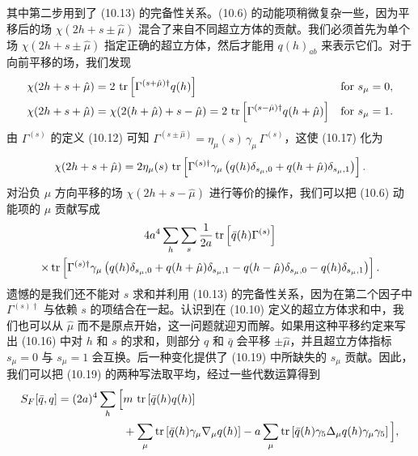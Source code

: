 其中第二步用到了 (10.13) 的完备性关系。(10.6) 的动能项稍微复杂一些，因为平移后的场 $\chi(2h + s \pm \hat\mu)$ 混合了来自不同超立方体的贡献。我们必须首先为单个场 $\chi(2h + s \pm \hat\mu)$ 指定正确的超立方体，然后才能用 $q(h)_{ab}$ 来表示它们。对于向前平移的场，我们发现
\begin{equation}
  \begin{aligned}
    \chi(2h + s + \hat\mu)
    &= 2\,\operatorname{tr}\left[\Gamma^{(s+\hat\mu)\dagger}q(h)\right]
    && \text{for } s_\mu = 0 , \\
    \chi(2h + s + \hat\mu)
    &= \chi(2(h+\hat\mu) + s-\hat\mu)
    = 2\,\operatorname{tr}\left[\Gamma^{(s-\hat\mu)\dagger}q(h+\hat\mu)\right]
    && \text{for } s_\mu = 1 .
  \end{aligned}
\end{equation}
由 $\Gamma^{(s)}$ 的定义 (10.12) 可知 $\Gamma^{(s\pm\hat\mu)} = \eta_\mu(s)\,\gamma_\mu\,\Gamma^{(s)}$，这使 (10.17) 化为
\begin{equation}
  \chi(2h + s + \hat\mu) =
  2\eta_\mu(s)\,\operatorname{tr}\left[\Gamma^{(s)\dagger}\gamma_\mu
  \left(q(h)\delta_{s_\mu,0} + q(h+\hat\mu)\delta_{s_\mu,1}\right)\right] .
\end{equation}
对沿负 $\mu$ 方向平移的场 $\chi(2h + s - \hat\mu)$ 进行等价的操作，我们可以把 (10.6) 动能项的 $\mu$ 贡献写成
\begin{multline}
  4a^4\sum_h\sum_s \frac{1}{2a}
  \operatorname{tr}\left[\bar q(h)\Gamma^{(s)}\right] \\
  \times \operatorname{tr}\left[\Gamma^{(s)\dagger}\gamma_\mu
  \left(q(h)\delta_{s_\mu,0} + q(h+\hat\mu)\delta_{s_\mu,1}
  - q(h-\hat\mu)\delta_{s_\mu,0} - q(h)\delta_{s_\mu,1}\right)\right] .
\end{multline}
遗憾的是我们还不能对 $s$ 求和并利用 (10.13) 的完备性关系，因为在第二个因子中 $\Gamma^{(s)\dagger}$ 与依赖 $s$ 的项结合在一起。认识到在 (10.10) 定义的超立方体求和中，我们也可以从 $\hat\mu$ 而不是原点开始，这一问题就迎刃而解。如果用这种平移约定来写出 (10.16) 中对 $h$ 和 $s$ 的求和，则部分 $q$ 和 $\bar q$ 会平移 $\pm\hat\mu$，并且超立方体指标 $s_\mu = 0$ 与 $s_\mu = 1$ 会互换。后一种变化提供了 (10.19) 中所缺失的 $s_\mu$ 贡献。因此，我们可以把 (10.19) 的两种写法取平均，经过一些代数运算得到
\begin{equation}
  \begin{split}
    S_F[\bar q, q] = (2a)^4\sum_h \Big[
    & m\,\operatorname{tr}\left[\bar q(h)q(h)\right] \\
    &+ \sum_\mu \operatorname{tr}\left[\bar q(h)\gamma_\mu\nabla_\mu q(h)\right]
    - a\sum_\mu \operatorname{tr}\left[\bar q(h)\gamma_5\Delta_\mu q(h)\gamma_\mu\gamma_5\right]
    \Big] ,
  \end{split}
\end{equation}
